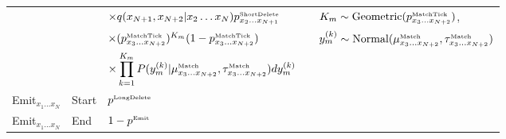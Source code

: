 \documentclass[10pt]{article}
\begin{document}
\begin{tabular}{lllll}
& & $\times q(x_{N+1},x_{N+2}|x_2\ldots x_N) p^{\mbox{\tiny ShortDelete}}_{x_2\ldots x_{N+1}}$ & & $K_m \sim \mbox{Geometric}(p^{\mbox{\tiny MatchTick}}_{x_3\ldots x_{N+2}})$, \\
& & $\times (p^{\mbox{\tiny MatchTick}}_{x_3\ldots x_{N+2}})^{K_m} (1-p^{\mbox{\tiny MatchTick}}_{x_3\ldots x_{N+2}})$ & & $y_m^{(k)} \sim \mbox{Normal}(\mu^{\mbox{\tiny Match}}_{x_3\ldots x_{N+2}},\tau^{\mbox{\tiny Match}}_{x_3\ldots x_{N+2}})$ \\
& & $\times \displaystyle \prod_{k=1}^{K_m} P(y^{(k)}_m|\mu^{\mbox{\tiny Match}}_{x_3\ldots x_{N+2}},\tau^{\mbox{\tiny Match}}_{x_3\ldots x_{N+2}}) dy^{(k)}_m$ \\
Emit${}_{x_1 \ldots x_N}$ & Start & $p^{\mbox{\tiny LongDelete}}$ & & \\
Emit${}_{x_1 \ldots x_N}$ & End & $1 - p^{\mbox{\tiny Emit}}$ & & \\
\hline
\end{tabular}

\normalsize
\restoregeometry
\end{document}
